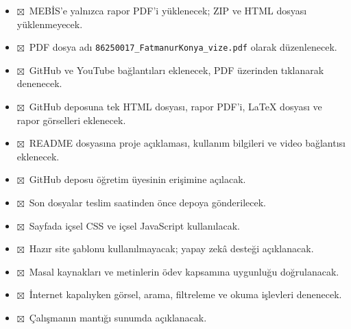 \documentclass[12pt,a4paper]{article}
\newcommand{\tik}{$\boxtimes$}
\begin{document}
\begin{itemize}[label={}]

\item \tik\
MEBİS'e yalnızca rapor PDF'i yüklenecek;
ZIP ve HTML dosyası yüklenmeyecek.

\item \tik\
PDF dosya adı
\texttt{86250017\_FatmanurKonya\_vize.pdf}
olarak düzenlenecek.

\item \tik\
GitHub ve YouTube bağlantıları eklenecek,
PDF üzerinden tıklanarak denenecek.

\item \tik\
GitHub deposuna tek HTML dosyası, rapor PDF'i,
LaTeX dosyası ve rapor görselleri eklenecek.

\item \tik\
README dosyasına proje açıklaması,
kullanım bilgileri ve video bağlantısı eklenecek.

\item \tik\
GitHub deposu öğretim üyesinin erişimine açılacak.

\item \tik\
Son dosyalar teslim saatinden önce depoya gönderilecek.

\item \tik\
Sayfada içsel CSS ve içsel JavaScript kullanılacak.

\item \tik\
Hazır site şablonu kullanılmayacak;
yapay zekâ desteği açıklanacak.

\item \tik\
Masal kaynakları ve metinlerin ödev kapsamına
uygunluğu doğrulanacak.

\item \tik\
İnternet kapalıyken görsel, arama,
filtreleme ve okuma işlevleri denenecek.

\item \tik\
Çalışmanın mantığı sunumda açıklanacak.

\end{itemize}
\end{document}
